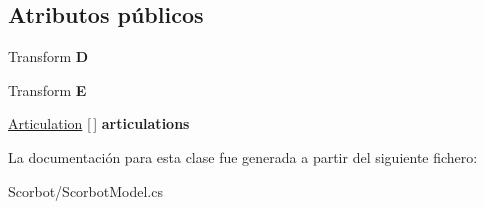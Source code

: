 \subsection*{Atributos públicos}
\begin{DoxyCompactItemize}
\item 
\mbox{\label{class_scorbot_model_a289b612c7d1813ad345f42432e7ba283}} 
Transform {\bfseries D}
\item 
\mbox{\label{class_scorbot_model_a2ba60afbee406ae079a8680b1836913b}} 
Transform {\bfseries E}
\item 
\mbox{\label{class_scorbot_model_a2c5605692707695fc2e4a260c5fbde03}} 
\mbox{\hyperlink{class_articulation}{Articulation}} \mbox{[}$\,$\mbox{]} {\bfseries articulations}
\end{DoxyCompactItemize}


La documentación para esta clase fue generada a partir del siguiente fichero\+:\begin{DoxyCompactItemize}
\item 
Scorbot/Scorbot\+Model.\+cs\end{DoxyCompactItemize}
